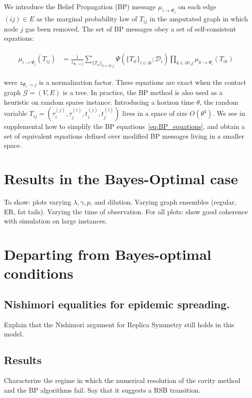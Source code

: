 \documentclass[a4paper, amsfonts, amssymb, amsmath, reprint, showkeys, nofootinbib, twoside, floatfix, pre,superscriptaddress]{revtex4-2}
\begin{document}
We introduce the Belief Propagation (BP) message $\mu_{i\to \Psi_j}$ on each edge $(ij)\in E$ as the marginal probability law of $T_{ij}$ in the amputated graph in which node $j$ gas been removed.
The set of BP messages obey a set of self-consistent equations:
\begin{widetext}	
\begin{align}
\label{eq:BP_equations}
\begin{aligned}
	\mu_{i\to \Psi_j}(T_{ij}) &= \frac{1}{z_{\Psi_i\to j}}\sum_{\{T_{il}\}_{k\in\partial i \setminus j}}\Psi(\{T_{il}\}_{l\in\partial i};\mathcal{D}_i)\prod_{k\in\partial i \setminus j}\mu_{k\to\Psi_i}(T_{ik})
\end{aligned}
\end{align}
\end{widetext}	
were $z_{\Psi_i\to j}$ is a normalization factor. 
These equations are exact when the contact graph $\mathcal{G}=(V,E)$ is a tree. In practice, the BP method is also used as a heuristic on random sparse instance.
Introducing a horizon time $\theta$, the random variable $T_{ij}=(\tau_i^{(j)},\tau_j^{(i)}, t_i^{(j)},t_j^{(i)})$ lives in a space of size $O(\theta^4)$.
We see in supplemental how to simplify the BP equations~\ref{eq:BP_equations}, and obtain a set of equivalent equations defined over modified BP messages living in a smaller space.


\section{Results in the Bayes-Optimal case}
To show: plots varying $\lambda, \gamma,p$, and dilution. Varying graph ensembles (regular, ER, fat tails). 
Varying the time of observation.
For all plots: show good coherence with simulation on large instances.

\section{Departing from Bayes-optimal conditions}
\subsection{Nishimori equalities for epidemic spreading.}
Explain that the Nishimori argument for Replica Symmetry still holds in this model.
\subsection{Results}
Characterize the regime in which the numerical resolution of the cavity method and the BP algorithms fail. Say that it suggests a RSB transition.
\end{document}

